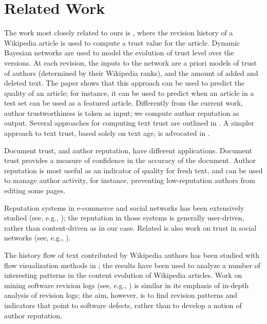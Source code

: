 \section{Related Work}

The work most closely related to ours is \cite{Zeng2006}, where the
revision history of a Wikipedia article is used to compute a trust
value for the article.
Dynamic Bayesian networks are used to model the
evolution of trust level over the versions. 
At each revision, the inputs to the network are a priori models of
trust of authors (determined by their Wikipedia ranks), 
and the amount of added and deleted text. 
The paper shows that this approach can be used to predict the quality
of an article; for instance, it can be used to predict when an article
in a test set can be used as a featured article.  
Differently from the current work, author trustworthiness is
taken as input; we compute author reputation as output. 
Several approaches for computing text trust are outlined in
\cite{WikiMTWtrust06}. 
A simpler approach to text trust, based solely on text age, is
advocated in \cite{Cr06}. 

Document trust, and author reputation, have different applications. 
Document trust provides a measure of confidence in the accuracy of the
document. 
Author reputation is most useful as an indicator of quality
for fresh text, and can be used to manage author activity, for
instance, preventing low-reputation authors from editing some pages. 

Reputation systems in e-commerce and social networks has been extensively
studied (see, e.g., \cite{Kleinberg99,ResnickZFK00,Dellarocas03,Kamvar03});
the reputation in those systems is generally user-driven, rather than
content-driven as in our case. 
Related is also work on trust in social networks (see, e.g.,
\cite{Guha04,Golbeck05}). 

The history flow of text contributed by Wikipedia authors has
been studied with flow visualization methods in \cite{Viegas04}; 
the results have been used to analyze a number of interesting patterns
in the content evolution of Wikipedia articles. 
Work on mining software revision logs (see, e.g., \cite{Livshits05})
is similar in its emphasis of in-depth analysis of revision logs; the
aim, however, is to find revision patterns and indicators that point
to software defects, rather than to develop a notion of author
reputation. 

